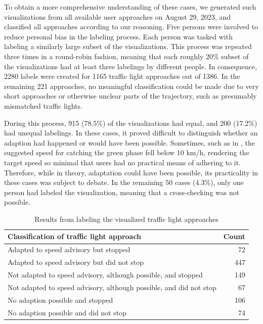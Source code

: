 To obtain a more comprehensive understanding of these cases, we generated such visualizations from all available user approaches on August 29, 2023, and classified all approaches according to our reasoning. Five persons were involved to reduce personal bias in the labeling process. Each person was tasked with labeling a similarly large subset of the visualizations. This process was repeated three times in a round-robin fashion, meaning that each roughly 20\% subset of the visualizations had at least three labelings by different people. In consequence, 2280 labels were created for 1165 traffic light approaches out of 1386. In the remaining 221 approaches, no meaningful classification could be made due to very short approaches or otherwise unclear parts of the trajectory, such as presumably mismatched traffic lights. 

During this process, 915 (78.5\%) of the visualizations had equal, and 200 (17.2\%) had unequal labelings. In these cases, it proved difficult to distinguish whether an adaption had happened or would have been possible. Sometimes, such as in , the suggested speed for catching the green phase fell below 10 km/h, rendering the target speed so minimal that users had no practical means of adhering to it. Therefore, while in theory, adaptation could have been possible, its practicality in these cases was subject to debate. In the remaining 50 cases (4.3\%), only one person had labeled the visualization, meaning that a cross-checking was not possible.

\begin{table}[t]
\centering
\begin{tabular}{@{}lr@{}}
\toprule
\textbf{Classification of traffic light approach} & \textbf{Count} \\
\midrule
Adapted to speed advisory but stopped & 72 \\
Adapted to speed advisory but did not stop & 447 \\
Not adapted to speed advisory, although possible, and stopped & 149 \\
Not adapted to speed advisory, although possible, and did not stop & 67 \\
No adaption possible and stopped & 106 \\
No adaption possible and did not stop & 74 \\
\bottomrule
\end{tabular}
\caption{Results from labeling the visualized traffic light approaches}
\label{tab:impacts-labeling-results}
\end{table}

